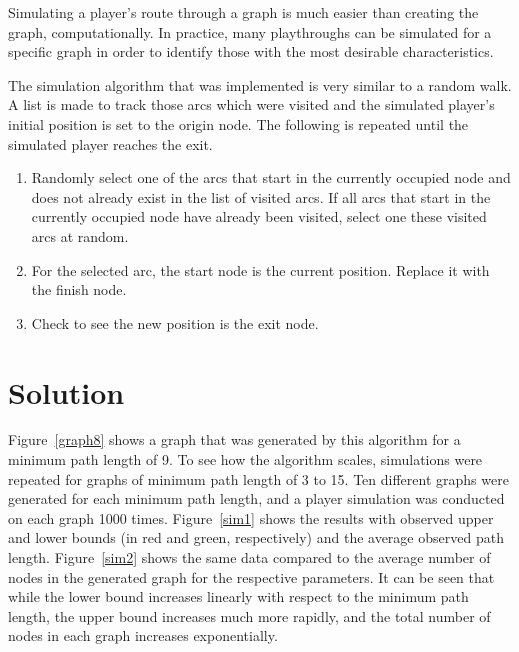 \documentclass[landscape, a0, final]{a0poster}
\begin{document}
\begin{minipage}{0.50\linewidth}
\begin{minipage}[t]{0.50\linewidth}
\begin{minipage}[t]{0.9\linewidth}
\end{minipage} %
\end{minipage} %
\end{minipage} %
\begin{minipage}{0.25\linewidth} %
    \centering
\begin{minipage}{0.8\linewidth} %

Simulating a player's route through a graph is much easier than creating the graph, computationally.  In practice, many playthroughs can be simulated for a specific graph in order to identify those with the most desirable characteristics.  

The simulation algorithm that was implemented is very similar to a random walk.  A list is made to track those arcs which were visited and the simulated player's initial position is set to the origin node.  The following is repeated until the simulated player reaches the exit.
    \begin{enumerate} 
        \item Randomly select one of the arcs that start in the currently occupied node and does not already exist in the list of visited arcs.  If all arcs that start in the currently occupied node have already been visited, select one these visited arcs at random.  
        \item For the selected arc, the start node is the current position.  Replace it with the finish node.
        \item Check to see the new position is the exit node.
    \end{enumerate} 

\section{Solution} 

Figure~\ref{graph8} shows a graph that was generated by this algorithm for a minimum path length of 9.  To see how the algorithm scales, simulations were repeated for graphs of minimum path length of 3 to 15.  Ten different graphs were generated for each minimum path length, and a player simulation was conducted on each graph 1000 times.  Figure~\ref{sim1} shows the results with observed upper and lower bounds (in red and green, respectively) and the average observed path length.  Figure~\ref{sim2} shows the same data compared to the average number of nodes in the generated graph for the respective parameters.  It can be seen that while the lower bound increases linearly with respect to the minimum path length, the upper bound increases much more rapidly, and the total number of nodes in each graph increases exponentially.


\end{minipage}
\end{minipage}
\end{document}
